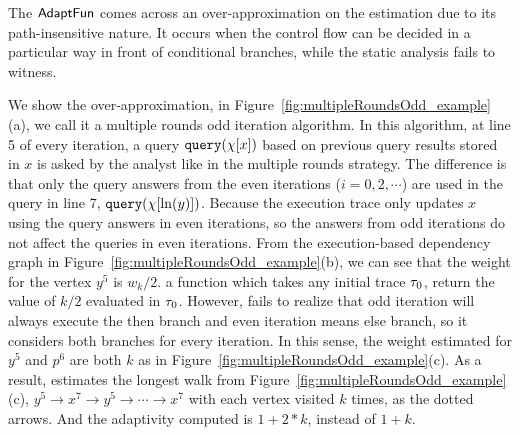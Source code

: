 \begin{example}
\label{ex:multipleRoundsOdd}
The $\textsf{AdaptFun}$ comes across an over-approximation on the estimation due to its path-insensitive nature. 
It occurs when the control flow can be decided in a particular way in front of conditional branches, while the static analysis fails to witness. 

We show the over-approximation, in Figure~\ref{fig:multipleRoundsOdd_example}(a),
we call it a multiple rounds odd iteration algorithm. In this algorithm, at line 5 of every iteration, 
a query ${\tt query}(\chi[x])$ based on previous query results stored in $x$ is asked by the analyst like in the multiple rounds strategy. The difference is that only the query answers from the even iterations ($i =0, 2, \cdots $) are 
used in the query 
in line 7, ${\tt query}(\chi[\ln(y)])$.
  Because the execution trace only updates 
$x$ using the query answers in even iterations, so the answers from odd iterations do not affect the queries in even iterations. 
From the execution-based dependency graph in Figure~\ref{fig:multipleRoundsOdd_example}(b), 
we can see that the weight for the vertex $y^5$ is 
$w_k/2$. a function which takes any initial trace $\mathtt{\tau}_0$, return the value of $k/2$ evaluated in $\mathtt{\tau}_0$.  
However, {\THESYSTEM} fails to realize that odd iteration will always execute the then branch and even iteration means else branch, so 
it considers both branches for every iteration. 
In this sense, the weight estimated for $y^5$ and $p^6$ are both 
$k$ as in Figure~\ref{fig:multipleRoundsOdd_example}(c).
As a result, {\THESYSTEM}  estimates the longest walk from Figure~\ref{fig:multipleRoundsOdd_example}(c),
$y^5  \to x^7  \to y^5  \to \cdots \to x^7  $ with each vertex visited $k$ times,
as the dotted arrows. 
And the adaptivity computed 
is $1 + 2 * k$, instead of $1 + k$. 
%


\end{example}
